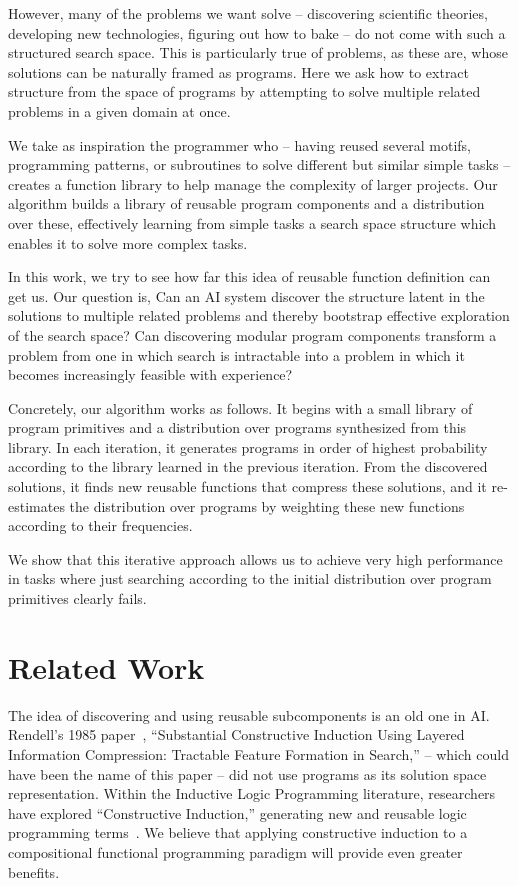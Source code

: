 \documentclass{article}
\begin{document}
However, many of the problems we want solve -- discovering scientific
theories, developing new technologies, figuring out how to bake -- do
not come with such a structured search space. This is particularly
true of problems, as these are, whose solutions can be naturally
framed as programs. Here we ask how to extract structure from the
space of programs by attempting to solve multiple related problems in
a given domain at once.

We take as inspiration the programmer who -- having reused several
motifs, programming patterns, or subroutines to solve different but
similar simple tasks -- creates a function library to help manage the
complexity of larger projects. Our algorithm builds a library
of reusable program components and a distribution over these,
effectively learning from simple tasks a search space structure which
enables it to solve more complex tasks.

In this work, we try to see how far this idea of reusable function
definition can get us. Our question is, Can an AI system discover the
structure latent in the solutions to multiple related problems and
thereby bootstrap effective exploration of the search space? Can
discovering modular program components transform a problem from one in
which search is intractable into a problem in which it becomes
increasingly feasible with experience?

Concretely, our algorithm works as follows. It begins with a small
library of program primitives and a distribution over programs
synthesized from this library. In each iteration, it generates
programs in order of highest probability according to the library
learned in the previous iteration. From the discovered solutions, it
finds new reusable functions that compress these solutions, and it
re-estimates the distribution over programs by weighting these new
functions according to their frequencies.

We show that this iterative approach allows us to achieve very high
performance in tasks where just searching according to the initial
distribution over program primitives clearly fails.


\section{Related Work}
The idea of discovering and using reusable subcomponents is an old one
in AI. Rendell's 1985 paper~\cite{DBLP:conf/ijcai/Rendell85},
``Substantial Constructive Induction Using Layered Information
Compression: Tractable Feature Formation in Search,'' -- which could
have been the name of this paper -- did not use programs as its
solution space representation. Within the Inductive Logic Programming
literature, researchers have explored ``Constructive Induction,''
generating new and reusable logic programming
terms~\cite{DBLP:conf/ijcai/Muggleton87}. We believe that applying
constructive induction to a compositional functional programming
paradigm will provide even greater benefits.
\end{document}
